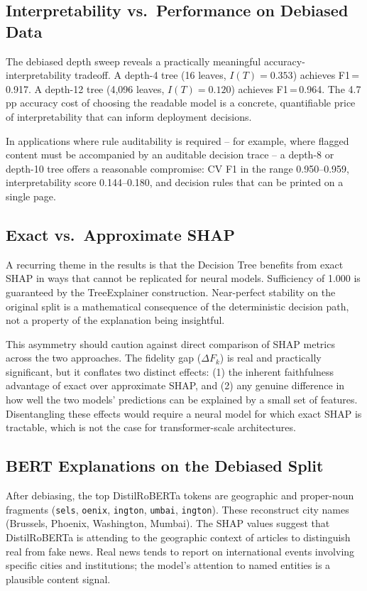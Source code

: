 \documentclass[journal,10pt,twocolumn]{IEEEtran}
\begin{document}
\subsection{Interpretability vs.\ Performance on Debiased Data}

The debiased depth sweep reveals a practically meaningful
accuracy-interpretability tradeoff.  A depth-4 tree (16 leaves,
$I(T) = 0.353$) achieves F1\,=\,0.917.  A depth-12 tree (4{,}096
leaves, $I(T) = 0.120$) achieves F1\,=\,0.964.  The 4.7 pp accuracy
cost of choosing the readable model is a concrete, quantifiable price of
interpretability that can inform deployment decisions.

In applications where rule auditability is required -- for example,
where flagged content must be accompanied by an auditable decision
trace -- a depth-8 or depth-10 tree offers a reasonable compromise:
CV F1 in the range 0.950--0.959, interpretability score 0.144--0.180,
and decision rules that can be printed on a single page.

\subsection{Exact vs.\ Approximate SHAP}

A recurring theme in the results is that the Decision Tree benefits from
exact SHAP in ways that cannot be replicated for neural models.
Sufficiency of 1.000 is guaranteed by the TreeExplainer construction.
Near-perfect stability on the original split is a mathematical
consequence of the deterministic decision path, not a property of the
explanation being insightful.

This asymmetry should caution against direct comparison of SHAP metrics
across the two approaches.  The fidelity gap ($\Delta F_k$) is real and
practically significant, but it conflates two distinct effects: (1) the
inherent faithfulness advantage of exact over approximate SHAP, and (2)
any genuine difference in how well the two models' predictions can be
explained by a small set of features.  Disentangling these effects would
require a neural model for which exact SHAP is tractable, which is not
the case for transformer-scale architectures.

\subsection{BERT Explanations on the Debiased Split}

After debiasing, the top DistilRoBERTa tokens are geographic and
proper-noun fragments (\texttt{sels}, \texttt{oenix}, \texttt{ington},
\texttt{umbai}, \texttt{ington}).  These reconstruct city names
(Brussels, Phoenix, Washington, Mumbai).  The SHAP values suggest that
DistilRoBERTa is attending to the geographic context of articles to
distinguish real from fake news.  Real news tends to report on
international events involving specific cities and institutions; the
model's attention to named entities is a plausible content signal.
\end{document}
